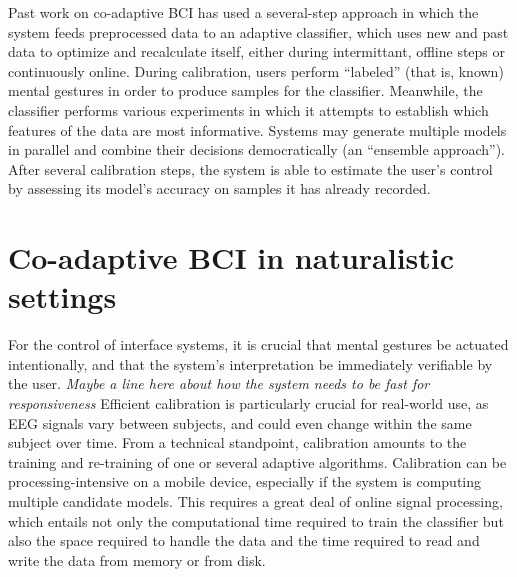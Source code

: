 Past work on co-adaptive BCI has used a several-step approach in which the system feeds preprocessed data to an adaptive classifier, which uses new and past data to optimize and recalculate itself, either during intermittant, offline steps or continuously online. \cite{vidaurre_fully_2006,shijian_lu_unsupervised_2009,das_unsupervised_2013} During calibration, users perform ``labeled'' (that is, known) mental gestures in order to produce samples for the classifier. Meanwhile, the classifier performs various experiments in which it attempts to establish which features of the data are most informative. Systems may generate multiple models in parallel and combine their decisions democratically (an ``ensemble approach''). After several calibration steps, the system is able to estimate the user's control by assessing its model's accuracy on samples it has already recorded.

\section{Co-adaptive BCI in naturalistic settings}

For the control of interface systems, it is crucial that mental gestures be actuated intentionally, and that the system's interpretation be immediately verifiable by the user. \cite{mcfarland_brain-computer_2011,ali_empirical_2014} \textit{Maybe a line here about how the system needs to be fast for responsiveness} Efficient calibration is particularly crucial for real-world use, as EEG signals vary between subjects, and could even change within the same subject over time. From a technical standpoint, calibration amounts to the training and re-training of one or several adaptive algorithms. Calibration can be processing-intensive on a mobile device, especially if the system is computing multiple candidate models. This requires a great deal of online signal processing, which entails not only the computational time required to train the classifier but also the space required to handle the data and the time required to read and write the data from memory or from disk.




